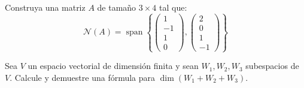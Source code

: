 \begin{prob} Construya una matriz $A$ de tamaño $3 \times 4$ tal que:
$$\mathcal{N}(A) = \operatorname{span}\left\{\begin{pmatrix} 1 \\ -1 \\ 1 \\ 0 \end{pmatrix}, \begin{pmatrix} 2 \\ 0 \\ 1 \\ -1 \end{pmatrix}\right\}$$
\end{prob}

\begin{prob} Sea $V$ un espacio vectorial de dimensión finita y sean $W_1, W_2, W_3$ subespacios de $V$. Calcule y demuestre una fórmula para $\dim(W_1 + W_2 + W_3).$
\end{prob}

